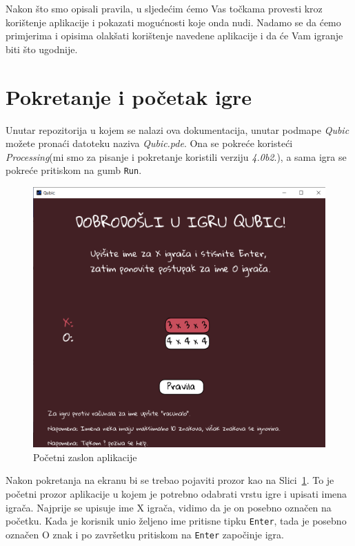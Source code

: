 \documentclass[12pt]{scrartcl}
\begin{document}
Nakon što smo opisali pravila, u sljedećim ćemo Vas točkama provesti kroz korištenje aplikacije i pokazati mogućnosti koje onda nudi. Nadamo se da ćemo primjerima i opisima olakšati korištenje navedene aplikacije i da će Vam igranje biti što ugodnije. 

\section{Pokretanje i početak igre}
Unutar repozitorija u kojem se nalazi ova dokumentacija, unutar podmape \emph{Qubic} možete pronaći datoteku naziva \emph{Qubic.pde}. 
Ona se pokreće koristeći \emph{Processing}(mi smo za pisanje i pokretanje koristili verziju \emph{4.0b2}.), a sama igra se pokreće pritiskom na gumb \texttt{Run}. 

\begin{figure}[ht]
	\centering
	\includegraphics[scale=0.55]{pocetna.png}
	\caption{Početni zaslon aplikacije}
	\label{fig:poc}
\end{figure}

Nakon pokretanja na ekranu bi se trebao pojaviti prozor kao na Slici~\ref{fig:poc}. To je početni prozor aplikacije u kojem je potrebno odabrati vrstu igre i upisati imena igrača. Najprije se upisuje ime X igrača, vidimo da je on posebno označen na početku. Kada je korisnik unio željeno ime pritisne tipku \texttt{Enter}, tada je posebno označen O znak i po završetku pritiskom na \texttt{Enter} započinje igra.
\end{document}
